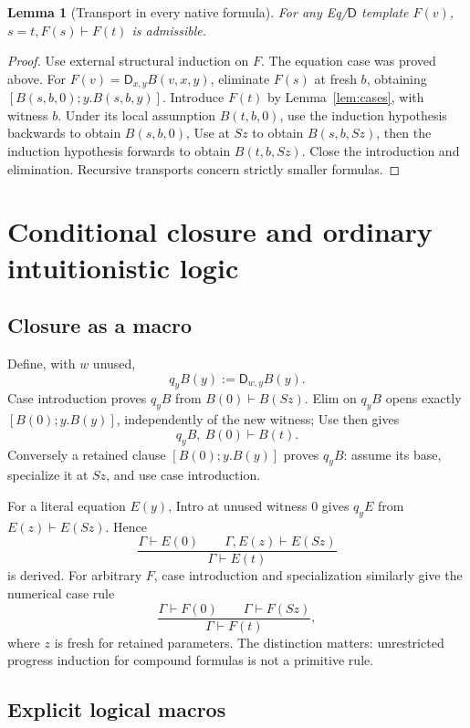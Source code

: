 \documentclass[11pt]{article}
\newtheorem{lemma}[theorem]{Lemma}
\theoremstyle{definition}\newtheorem{definition}[theorem]{Definition}
\newcommand{\D}{\mathsf D}
\begin{document}
\begin{lemma}[Transport in every native formula]\label{lem:fulltr}
For any Eq/$\D$ template $F(v)$,
$s=t,F(s)\vdash F(t)$ is admissible.
\end{lemma}
\begin{proof}
Use external structural induction on $F$. The equation case was
proved above. For $F(v)=\D_{x,y}B(v,x,y)$, eliminate $F(s)$ at
fresh $b$, obtaining $[B(s,b,0);y.B(s,b,y)]$. Introduce $F(t)$
by Lemma~\ref{lem:cases}, with witness $b$. Under its local
assumption $B(t,b,0)$, use the induction hypothesis backwards to
obtain $B(s,b,0)$, Use at $Sz$ to obtain $B(s,b,Sz)$, then the
induction hypothesis forwards to obtain $B(t,b,Sz)$. Close the
introduction and elimination. Recursive transports concern strictly
smaller formulas.
\end{proof}

\section{Conditional closure and ordinary intuitionistic logic}

\subsection{Closure as a macro}

Define, with $w$ unused,
\[
                          q_yB(y):=\D_{w,y}B(y).
\]
Case introduction proves $q_yB$ from $B(0)\vdash B(Sz)$.
Elim on $q_yB$ opens exactly $[B(0);y.B(y)]$, independently
of the new witness; Use then gives
\[
                    q_yB,\ B(0)\vdash B(t).
\]
Conversely a retained clause $[B(0);y.B(y)]$ proves $q_yB$:
assume its base, specialize it at $Sz$, and use case introduction.

For a literal equation $E(y)$, Intro at unused witness $0$ gives
$q_yE$ from $E(z)\vdash E(Sz)$. Hence
\[
 \frac{\Gamma\vdash E(0)\qquad\Gamma,E(z)\vdash E(Sz)}
      {\Gamma\vdash E(t)}
 \tag{Equation induction}
\]
is derived. For arbitrary $F$, case introduction and specialization
similarly give the numerical case rule
\[
 \frac{\Gamma\vdash F(0)\qquad\Gamma\vdash F(Sz)}
      {\Gamma\vdash F(t)},
 \tag{Numerical cases}
\]
where $z$ is fresh for retained parameters. The distinction matters:
unrestricted progress induction for compound formulas is not a primitive rule.

\subsection{Explicit logical macros}
\end{document}
